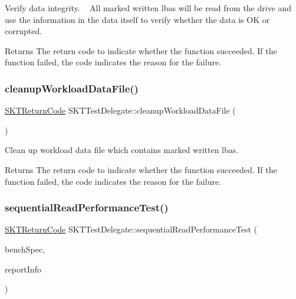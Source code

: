 Verify data integrity. ~\newline
All marked written lbas will be read from the drive and use the information in the data itself to verify whether the data is OK or corrupted. 

\begin{DoxyReturn}{Returns}
The return code to indicate whether the function succeeded. If the function failed, the code indicates the reason for the failure. 
\end{DoxyReturn}
\mbox{\label{class_s_k_t_test_delegate_ad25f9f0d4aabe6c159b08c751c3fce6a}} 
\subsubsection{\texorpdfstring{cleanupWorkloadDataFile()}{cleanupWorkloadDataFile()}}
{\footnotesize\ttfamily \mbox{\hyperlink{_storage_kit_test_delegate_8h_a143844aea21c1ac420c1d0307a69deb7}{S\+K\+T\+Return\+Code}} S\+K\+T\+Test\+Delegate\+::cleanup\+Workload\+Data\+File (\begin{DoxyParamCaption}{ }\end{DoxyParamCaption})}



Clean up workload data file which contains marked written lbas. 

\begin{DoxyReturn}{Returns}
The return code to indicate whether the function succeeded. If the function failed, the code indicates the reason for the failure. 
\end{DoxyReturn}
\mbox{\label{class_s_k_t_test_delegate_a352d1c5033473624451b30e54117d316}} 
\subsubsection{\texorpdfstring{sequentialReadPerformanceTest()}{sequentialReadPerformanceTest()}}
{\footnotesize\ttfamily \mbox{\hyperlink{_storage_kit_test_delegate_8h_a143844aea21c1ac420c1d0307a69deb7}{S\+K\+T\+Return\+Code}} S\+K\+T\+Test\+Delegate\+::sequential\+Read\+Performance\+Test (\begin{DoxyParamCaption}\item[{\mbox{\hyperlink{struct_s_k_t_benchmark_specific_setup}{S\+K\+T\+Benchmark\+Specific\+Setup}} \&}]{bench\+Spec,  }\item[{\mbox{\hyperlink{struct_s_k_t_benchmark_report}{S\+K\+T\+Benchmark\+Report}} \&}]{report\+Info }\end{DoxyParamCaption})}



